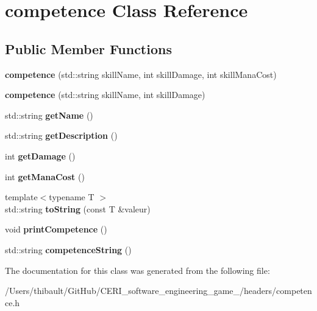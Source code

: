 \hypertarget{classcompetence}{}\section{competence Class Reference}
\label{classcompetence}
\subsection*{Public Member Functions}
\begin{DoxyCompactItemize}
\item 
\mbox{\label{classcompetence_ae214635d91c8b1c5a37352dccbcd2397}} 
{\bfseries competence} (std\+::string skill\+Name, int skill\+Damage, int skill\+Mana\+Cost)
\item 
\mbox{\label{classcompetence_a269947808c5e8662ecabb11e96a4d9c0}} 
{\bfseries competence} (std\+::string skill\+Name, int skill\+Damage)
\item 
\mbox{\label{classcompetence_abbb996751e239fc151caae2a73947710}} 
std\+::string {\bfseries get\+Name} ()
\item 
\mbox{\label{classcompetence_ae0980a623fb74c32a630400cdb56cd14}} 
std\+::string {\bfseries get\+Description} ()
\item 
\mbox{\label{classcompetence_a752380fae93494815023b3a177e57f44}} 
int {\bfseries get\+Damage} ()
\item 
\mbox{\label{classcompetence_a8346c6ae95df148e42f26b9a94655c8f}} 
int {\bfseries get\+Mana\+Cost} ()
\item 
\mbox{\label{classcompetence_adbd67d184b75c46bc22c1aef070d9246}} 
{\footnotesize template$<$typename T $>$ }\\std\+::string {\bfseries to\+String} (const T \&valeur)
\item 
\mbox{\label{classcompetence_a5e486c7db01680742633e93c42a638b3}} 
void {\bfseries print\+Competence} ()
\item 
\mbox{\label{classcompetence_a4acc4e02f7e8c49a6d4d1db307e8f03d}} 
std\+::string {\bfseries competence\+String} ()
\end{DoxyCompactItemize}


The documentation for this class was generated from the following file\+:\begin{DoxyCompactItemize}
\item 
/\+Users/thibault/\+Git\+Hub/\+C\+E\+R\+I\+\_\+software\+\_\+engineering\+\_\+game\+\_/headers/competence.\+h\end{DoxyCompactItemize}
